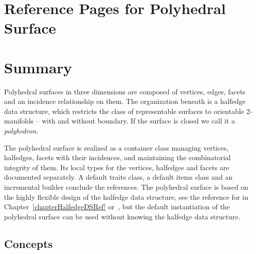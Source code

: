 
\clearpage
\section{Reference Pages for Polyhedral Surface}
\label{chapterPolyhedronRef}


\section*{Summary}

Polyhedral surfaces in three dimensions are composed of vertices,
edges, facets and an incidence relationship on them. The organization
beneath is a halfedge data structure, which restricts the class of
representable surfaces to orientable 2-manifolds -- with and without
boundary. If the surface is closed we call it a {\em polyhedron}.

The polyhedral surface is realized as a container class managing
vertices, halfedges, facets with their incidences, and maintaining the
combinatorial integrity of them. Its local types for the vertices,
halfedges and facets are documented separately.  A default traits
class, a default items class and an incremental builder conclude the
references. The polyhedral surface is based on the highly flexible
design of the halfedge data structure, see the reference for
 in Chapter~\ref{chapterHalfedgeDSRef}
or~\cite{k-ugpdd-99}, but the default instantiation of the polyhedral
surface can be used without knowing the halfedge data structure.

\subsection*{Concepts}


